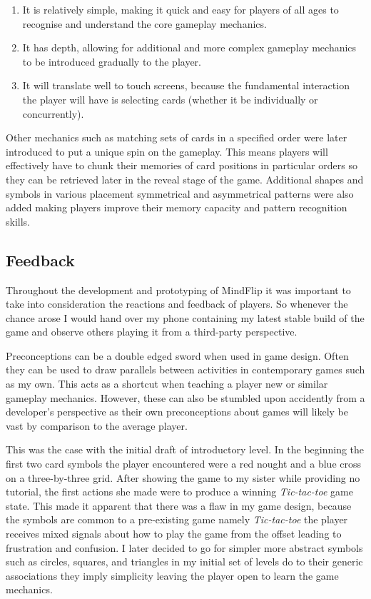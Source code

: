 \documentclass[final]{cmpreport}
\begin{document}

\begin{enumerate}
  \item It is relatively simple, making it quick and easy for players of all ages to recognise and understand the core gameplay mechanics.
  \item It has depth, allowing for additional and more complex gameplay mechanics to be introduced gradually to the player.
  \item It will translate well to touch screens, because the fundamental interaction the player will have is selecting cards (whether it be individually or concurrently).
\end{enumerate}

Other mechanics such as matching sets of cards in a specified order were later introduced to put a unique spin on the gameplay. This means players will effectively have to chunk their memories of card positions in particular orders so they can be retrieved later in the reveal stage of the game. Additional shapes and symbols in various placement symmetrical and asymmetrical patterns were also added making players improve their memory capacity and pattern recognition skills.

\subsection{Feedback}
Throughout the development and prototyping of MindFlip it was important to take into consideration the reactions and feedback of players. So whenever the chance arose I would hand over my phone containing my latest stable build of the game and observe others playing it from a third-party perspective.

Preconceptions can be a double edged sword when used in game design. Often they can be used to draw parallels between activities in contemporary games such as my own. This acts as a shortcut when teaching a player new or similar gameplay mechanics. However, these can also be stumbled upon accidently from a developer's perspective as their own preconceptions about games will likely be vast by comparison to the average player.

This was the case with the initial draft of introductory level. In the beginning the first two card symbols the player encountered were a red nought and a blue cross on a three-by-three grid. After showing the game to my sister while providing no tutorial, the first actions she made were to produce a winning \emph{Tic-tac-toe} game state. This made it apparent that there was a flaw in my game design, because the symbols are common to a pre-existing game namely \emph{Tic-tac-toe} the player receives mixed signals about how to play the game from the offset leading to frustration and confusion. I later decided to go for simpler more abstract symbols such as circles, squares, and triangles in my initial set of levels do to their generic associations they imply simplicity leaving the player open to learn the game mechanics.
\end{document}
